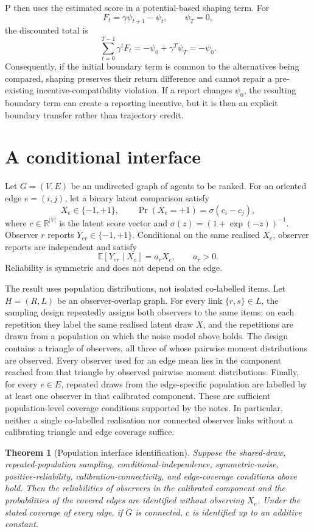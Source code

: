 \documentclass{article}
\newtheorem{theorem}{Theorem}
\begin{document}
P then uses the estimated score in a potential-based shaping term.  For
\[
F_t=\gamma\psi_{t+1}-\psi_t, \qquad \psi_T=0,
\]
the discounted total is
\[
\sum_{t=0}^{T-1}\gamma^tF_t
=-\psi_0+\gamma^T\psi_T=-\psi_0.
\]
Consequently, if the initial boundary term is common to the alternatives being compared, shaping preserves their return difference and cannot repair a pre-existing incentive-compatibility violation. %
If a report changes $\psi_0$, the resulting boundary term can create a reporting incentive, but it is then an explicit boundary transfer rather than trajectory credit. %

\section{A conditional interface}

Let $G=(V,E)$ be an undirected graph of agents to be ranked.  For an oriented edge $e=(i,j)$, let a binary latent comparison satisfy
\[
X_e\in\{-1,+1\},\qquad
\Pr(X_e=+1)=\sigma(c_i-c_j),
\]
where $c\in\mathbb{R}^{|V|}$ is the latent score vector and $\sigma(z)=(1+\exp(-z))^{-1}$. %
Observer $r$ reports $Y_{er}\in\{-1,+1\}$.  Conditional on the same realised $X_e$, observer reports are independent and satisfy
\[
\mathbb{E}[Y_{er}\mid X_e]=a_rX_e,\qquad a_r>0.
\]
Reliability is symmetric and does not depend on the edge. %

The result uses population distributions, not isolated co-labelled items.  Let $H=(R,L)$ be an observer-overlap graph.  For every link $\{r,s\}\in L$, the sampling design repeatedly assigns both observers to the same items: on each repetition they label the same realised latent draw $X$, and the repetitions are drawn from a population on which the noise model above holds.  The design contains a triangle of observers, all three of whose pairwise moment distributions are observed.  Every observer used for an edge mean lies in the component reached from that triangle by observed pairwise moment distributions.  Finally, for every $e\in E$, repeated draws from the edge-specific population are labelled by at least one observer in that calibrated component.  These are sufficient population-level coverage conditions supported by the notes.  In particular, neither a single co-labelled realisation nor connected observer links without a calibrating triangle and edge coverage suffice. %

\begin{theorem}[Population interface identification]
Suppose the shared-draw, repeated-population sampling, conditional-independence, symmetric-noise, positive-reliability, calibration-connectivity, and edge-coverage conditions above hold.  Then the reliabilities of observers in the calibrated component and the probabilities of the covered edges are identified without observing $X_e$.  Under the stated coverage of every edge, if $G$ is connected, $c$ is identified up to an additive constant. %
\end{theorem}
\end{document}
